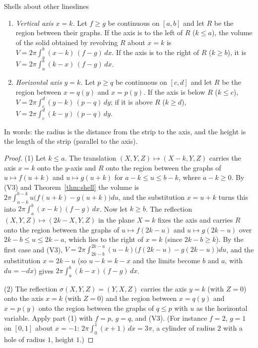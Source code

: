 \documentclass[11pt]{article}
\begin{document}
\begin{thm}{Shells about other lines}{lines}
\begin{enumerate}[label=(\arabic*),nosep]
  \item \emph{Vertical axis $x=k$.} Let $f\ge g$ be continuous on $[a,b]$ and let $R$ be the region between their graphs. If the axis is to the left of $R$ ($k\le a$), the volume of the solid obtained by revolving $R$ about $x=k$ is $V=2\pi\int_a^b(x-k)\,(f-g)\,dx$. If the axis is to the right of $R$ ($k\ge b$), it is $V=2\pi\int_a^b(k-x)\,(f-g)\,dx$.
  \item \emph{Horizontal axis $y=k$.} Let $p\ge q$ be continuous on $[c,d]$ and let $R$ be the region between $x=q(y)$ and $x=p(y)$. If the axis is below $R$ ($k\le c$), $V=2\pi\int_c^d(y-k)\,(p-q)\,dy$; if it is above $R$ ($k\ge d$), $V=2\pi\int_c^d(k-y)\,(p-q)\,dy$.
\end{enumerate}
In words: the radius is the distance from the strip to the axis, and the height is the length of the strip (parallel to the axis).
\end{thm}
\begin{proof}
(1) Let $k\le a$. The translation $(X,Y,Z)\mapsto(X-k,Y,Z)$ carries the axis $x=k$ onto the $y$-axis and $R$ onto the region between the graphs of $u\mapsto f(u+k)$ and $u\mapsto g(u+k)$ for $a-k\le u\le b-k$, where $a-k\ge0$. By (V3) and Theorem~\ref{thm:shell} the volume is $2\pi\int_{a-k}^{b-k}u\bigl(f(u+k)-g(u+k)\bigr)du$, and the substitution $x=u+k$ turns this into $2\pi\int_a^b(x-k)(f-g)\,dx$. Now let $k\ge b$. The reflection $(X,Y,Z)\mapsto(2k-X,Y,Z)$ in the plane $X=k$ fixes the axis and carries $R$ onto the region between the graphs of $u\mapsto f(2k-u)$ and $u\mapsto g(2k-u)$ over $2k-b\le u\le2k-a$, which lies to the right of $x=k$ (since $2k-b\ge k$). By the first case and (V3), $V=2\pi\int_{2k-b}^{2k-a}(u-k)\bigl(f(2k-u)-g(2k-u)\bigr)du$, and the substitution $x=2k-u$ (so $u-k=k-x$ and the limits become $b$ and $a$, with $du=-dx$) gives $2\pi\int_a^b(k-x)(f-g)\,dx$.

(2) The reflection $\sigma(X,Y,Z)=(Y,X,Z)$ carries the axis $y=k$ (with $Z=0$) onto the axis $x=k$ (with $Z=0$) and the region between $x=q(y)$ and $x=p(y)$ onto the region between the graphs of $q\le p$ with $u$ as the horizontal variable. Apply part (1) with $f=p$, $g=q$, and (V3). (For instance $f=2$, $g=1$ on $[0,1]$ about $x=-1$: $2\pi\int_0^1(x+1)\,dx=3\pi$, a cylinder of radius $2$ with a hole of radius $1$, height $1$.)
\end{proof}
\end{document}
